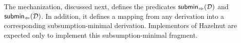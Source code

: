 The mechanization, discussed next, defines the predicates $\mathsf{submin}_{\Rightarrow}(\mathcal{D})$ and $\mathsf{submin}_{\Leftarrow}(\mathcal{D})$. In addition, it defines a mapping from
any derivation into a corresponding subsumption-minimal derivation. Implementors of Hazelnut are expected only to implement this subsumption-minimal fragment.
